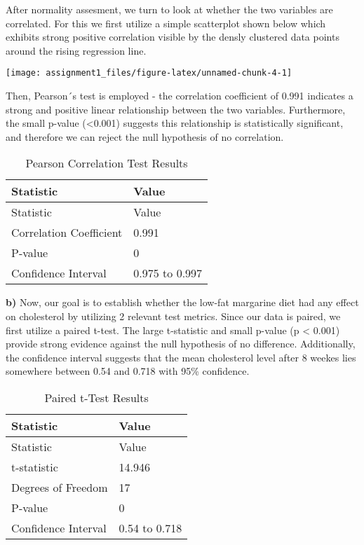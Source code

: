 \documentclass[
]{article}
\begin{document}
After normality assesment, we turn to look at whether the two variables
are correlated. For this we first utilize a simple scatterplot shown
below which exhibits strong positive correlation visible by the densly
clustered data points around the rising regression line.

\begin{center}\texttt{[image: assignment1\_files/figure-latex/unnamed-chunk-4-1]} \end{center}

Then, Pearson´s test is employed - the correlation coefficient of 0.991
indicates a strong and positive linear relationship between the two
variables. Furthermore, the small p-value (\textless0.001) suggests this
relationship is statistically significant, and therefore we can reject
the null hypothesis of no correlation.

\begin{longtable}[]{@{}ll@{}}
\caption{Pearson Correlation Test Results}\tabularnewline
\toprule\noalign{}
Statistic & Value \\
\midrule\noalign{}
\endfirsthead
\toprule\noalign{}
Statistic & Value \\
\midrule\noalign{}
\endhead
\bottomrule\noalign{}
\endlastfoot
Correlation Coefficient & 0.991 \\
P-value & 0 \\
Confidence Interval & 0.975 to 0.997 \\
\end{longtable}

\textbf{b)} Now, our goal is to establish whether the low-fat margarine
diet had any effect on cholesterol by utilizing 2 relevant test metrics.
Since our data is paired, we first utilize a paired t-test. The large
t-statistic and small p-value (p \textless{} 0.001) provide strong
evidence against the null hypothesis of no difference. Additionally, the
confidence interval suggests that the mean cholesterol level after 8
weekes lies somewhere between 0.54 and 0.718 with 95\% confidence.

\begin{longtable}[]{@{}ll@{}}
\caption{Paired t-Test Results}\tabularnewline
\toprule\noalign{}
Statistic & Value \\
\midrule\noalign{}
\endfirsthead
\toprule\noalign{}
Statistic & Value \\
\midrule\noalign{}
\endhead
\bottomrule\noalign{}
\endlastfoot
t-statistic & 14.946 \\
Degrees of Freedom & 17 \\
P-value & 0 \\
Confidence Interval & 0.54 to 0.718 \\
\end{longtable}
\end{document}
